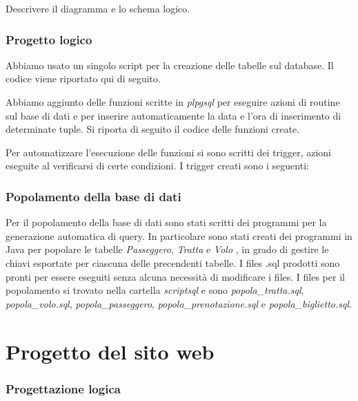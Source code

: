 \documentclass[a4paper,10pt]{article}
\begin{document}
Descrivere il diagramma e lo schema logico.

\section{Progetto logico}

Abbiamo usato un singolo script per la creazione delle tabelle sul database. Il codice viene riportato qui di seguito.



Abbiamo aggiunto delle funzioni scritte in \textit{plpgsql} per eseguire azioni di routine sul base di dati e per inserire automaticamente la data e l'ora di inserimento di determinate tuple.
Si riporta di seguito il codice delle funzioni create.



Per automatizzare l'esecuzione delle funzioni si sono scritti dei trigger, azioni eseguite al verificarsi di certe condizioni. I trigger creati sono i seguenti:



 \section{Popolamento della base di dati}
 Per il popolamento della base di dati sono stati scritti dei programmi per la generazione automatica di query.
 In particolare sono stati creati dei programmi in Java per popolare le tabelle \textit{Passeggero}, \textit{Tratta} e \textit{Volo} , in grado di gestire 
 le chiavi esportate per ciascuna delle precendenti tabelle. I files .sql prodotti sono pronti 
 per essere eseguiti senza alcuna necessit\`a di modificare i files. I files per il popolamento si trovato nella cartella \textit{script\-sql} e sono \textit{popola\_tratta.sql},
 \textit{popola\_volo.sql}, \textit{popola\_passeggero}, \textit{popola\_prenotazione.sql} e \textit{popola\_biglietto.sql}.


 \newpage
\part{Progetto del sito web}

\section{Progettazione logica}
\end{document}
